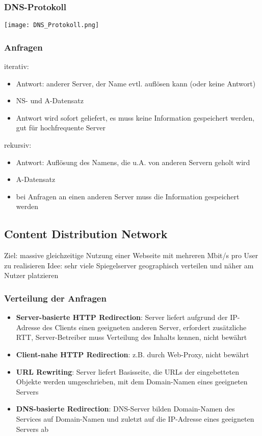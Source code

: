 		\subsubsection{DNS-Protokoll}
			\begin{center}
				\texttt{[image: DNS\_Protokoll.png]}
			\end{center}
		\subsubsection{Anfragen}
			iterativ:
			\begin{itemize}
				\item Antwort: anderer Server, der Name evtl. auflösen kann (oder keine Antwort)
				\item NS- und A-Datensatz
				\item Antwort wird sofort geliefert, es muss keine Information gespeichert werden, gut für hochfrequente Server
			\end{itemize}
			rekursiv:
			\begin{itemize}
				\item Antwort: Auflösung des Namens, die u.A. von anderen Servern geholt wird
				\item A-Datensatz
				\item bei Anfragen an einen anderen Server muss die Information gespeichert werden
			\end{itemize}
	\subsection{Content Distribution Network}
		Ziel: massive gleichzeitige Nutzung einer Webseite mit mehreren Mbit/s pro User zu realisieren \newline \newline
		Idee: sehr viele Spiegelserver geographisch verteilen und näher am Nutzer platzieren
		\subsubsection{Verteilung der Anfragen}
			\begin{itemize}
				\item \textbf{Server-basierte HTTP Redirection}: Server liefert aufgrund der IP-Adresse des Clients einen geeigneten anderen Server, erfordert zusätzliche RTT, Server-Betreiber muss Verteilung des Inhalts kennen, nicht bewährt
				\item \textbf{Client-nahe HTTP Redirection}: z.B. durch Web-Proxy, nicht bewährt
				\item \textbf{URL Rewriting}: Server liefert Basisseite, die URLs der eingebetteten Objekte werden umgeschrieben, mit dem Domain-Namen eines geeigneten Servers
				\item \textbf{DNS-basierte Redirection}: DNS-Server bilden Domain-Namen des Services auf Domain-Namen und zuletzt auf die IP-Adresse eines geeigneten Servers ab
			\end{itemize}

